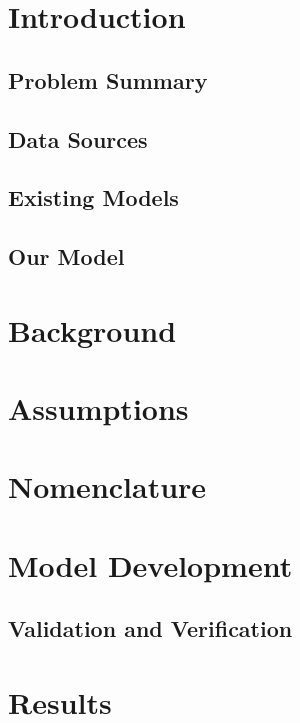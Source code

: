 \documentclass[12pt]{article}
\begin{document}
\newpage
{\small\tableofcontents}


\newpage
\section{Introduction}

\subsection{Problem Summary}

\subsection{Data Sources}
    
\subsection{Existing Models}

\subsection{Our Model}


\section{Background}


\section{Assumptions}


\section{Nomenclature}


\section{Model Development}

\subsection{Validation and Verification}


\section{Results}
\end{document}
